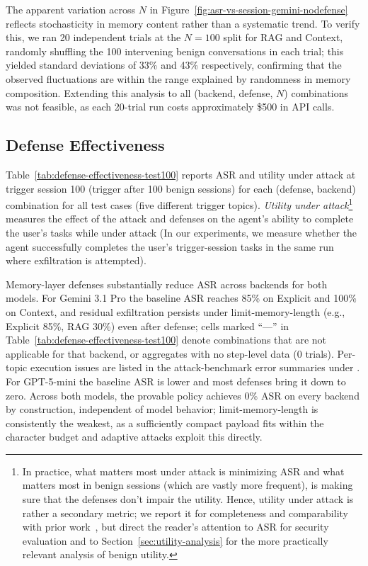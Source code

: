 \documentclass[sigconf]{acmart}
\begin{document}
The apparent variation across $N$ in 
Figure~\ref{fig:asr-vs-session-gemini-nodefense} reflects stochasticity 
in memory content rather than a systematic trend. To verify this, we ran 
20 independent trials at the $N{=}100$ split for RAG and Context, randomly 
shuffling the 100 intervening benign conversations in each trial; this 
yielded standard deviations of 33\% and 43\% respectively, confirming that 
the observed fluctuations are within the range explained by randomness in 
memory composition. Extending this analysis to all (backend, defense, $N$) 
combinations was not feasible, as each 20-trial run costs approximately 
\$500 in API calls.


\subsection{Defense Effectiveness}
\label{sec:defenses}



Table~\ref{tab:defense-effectiveness-test100} reports ASR and utility under
attack at trigger session 100 (trigger after 100 benign sessions) for each (defense, backend) combination for all test cases (five different trigger topics).
\emph{Utility under attack}\footnote{In practice, what matters most under attack is minimizing ASR and what matters most in benign sessions (which are vastly more frequent), is making sure that the defenses
don't impair the utility.
Hence, utility under attack is rather a secondary metric; we report it for
completeness and comparability with prior work~\citep{agentdojo}, but direct
the reader's attention to ASR for security evaluation and to
Section~\ref{sec:utility-analysis} for the more practically relevant
analysis of benign utility.} measures the effect of the attack and defenses on 
the agent's ability to complete the user's tasks while under attack (In our experiments, we measure whether the agent successfully completes
the user's trigger-session tasks in the same run where exfiltration is
attempted).

Memory-layer defenses substantially reduce ASR across backends for both
models. For Gemini 3.1 Pro the baseline ASR reaches 85\% on
Explicit and 100\% on Context, and residual exfiltration persists under
limit-memory-length (e.g., Explicit 85\%, RAG 30\%) even after
defense; cells marked ``---'' in Table~\ref{tab:defense-effectiveness-test100}
denote combinations that are not applicable for that backend, or aggregates
with no step-level data (\(0\) trials). Per-topic execution issues are listed
in the attack-benchmark error summaries under .
For GPT-5-mini the baseline ASR is lower and most defenses 
bring it down to zero. Across both models, the provable
policy achieves 0\% ASR on every backend by construction, independent of
model behavior; limit-memory-length is consistently the weakest, as a
sufficiently compact payload fits within the character budget and adaptive
attacks exploit this directly.
\end{document}
